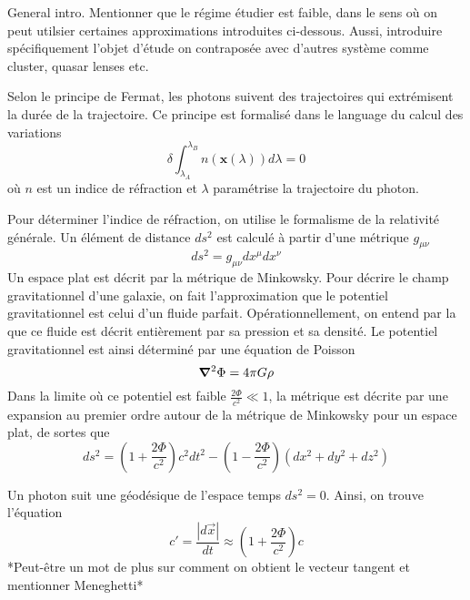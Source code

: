 General intro. Mentionner que le régime étudier est faible, dans le sens où 
on peut utilsier certaines approximations introduites ci-dessous. Aussi, introduire 
spécifiquement l'objet d'étude on contraposée avec d'autres système comme cluster, 
quasar lenses etc.


Selon le principe de Fermat, les photons suivent des trajectoires qui extrémisent 
la durée de la trajectoire. Ce principe est formalisé dans le language du calcul 
des variations
\begin{equation}\label{eq:Fermat}
        \delta \int_{\lambda_A}^{\lambda_B} n(\mathbf{x}(\lambda))d\lambda = 0 
\end{equation} 
où $n$ est un indice de réfraction et $\lambda$ paramétrise la trajectoire du photon.

Pour déterminer l'indice de réfraction, on utilise le formalisme de la relativité 
générale. Un élément de distance $ds^2$ est calculé à partir d'une métrique $g_{\mu \nu}$ 
\begin{equation}\label{eq:ds}
        ds^2 = g_{\mu \nu}dx^{\mu}dx^{\nu}
\end{equation} 
Un espace plat est décrit par la métrique de Minkowsky. Pour décrire le champ 
gravitationnel d'une galaxie, on fait l'approximation que le potentiel gravitationnel 
est celui d'un fluide parfait. Opérationnellement, on entend par la que ce fluide est décrit entièrement 
par sa pression et sa densité. Le potentiel gravitationnel est ainsi déterminé 
par une équation de Poisson 
\begin{equation}\label{eq:Poisson}
       \grad^{2}\Phi = 4\pi G \rho 
\end{equation} 
Dans la limite où ce potentiel est faible $\displaystyle \frac{2\Phi}{c^{2}} \ll 1$, la 
métrique est décrite par une expansion au premier ordre autour de la 
métrique de Minkowsky pour un espace plat, de sortes que
\begin{equation}\label{eq:newton}
        ds^2 = \left( 1 + \frac{2\Phi}{c^{2}} \right)c^{2}dt^{2} - \left( 1 - \frac{2\Phi}{c^{2}} \right)(dx^{2} + dy^{2} + dz^{2})
\end{equation} 

Un photon suit une géodésique de l'espace temps $ds^{2} = 0$. Ainsi, on trouve 
l'équation
\begin{equation}\label{eq:refraction index}
        c' = \frac{|d\vec{x}|}{dt} \approx \left( 1 + \frac{2\Phi}{c^{2}} \right)c
\end{equation} 
*Peut-être un mot de plus sur comment on obtient le vecteur tangent et mentionner 
Meneghetti*

